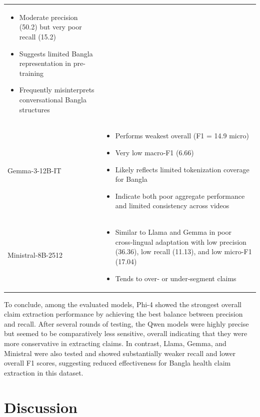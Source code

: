 \documentclass[]{article}
\begin{document}
\begin{longtable}[]{@{}
  >{\raggedright\arraybackslash}p{}
  >{\raggedright\arraybackslash}p{}@{}}
\begin{minipage}[t]{\linewidth}
\begin{itemize}
\item
  Moderate precision (50.2) but very poor recall (15.2)
\item
  Suggests limited Bangla representation in pre-training
\item
  Frequently misinterprets conversational Bangla structures
\end{itemize}
\end{minipage} \\
Gemma-3-12B-IT & \begin{minipage}[t]{\linewidth}\raggedright
\begin{itemize}
\item
  Performs weakest overall (F1 = 14.9 micro)
\item
  Very low macro‑F1 (6.66)
\item
  Likely reflects limited tokenization coverage for Bangla
\item
  Indicate both poor aggregate performance and limited consistency
  across videos
\end{itemize}
\end{minipage} \\
Ministral-8B-2512 &
\begin{minipage}[t]{\linewidth}\raggedright
\begin{itemize}
\item
  Similar to Llama and Gemma in poor cross‑lingual adaptation with low
  precision (36.36), low recall (11.13), and low micro-F1 (17.04)
\item
  Tends to over‑ or under‑segment claims
\end{itemize}
\end{minipage} \\
\end{longtable}

To conclude, among the evaluated models, Phi-4 showed the strongest overall claim
extraction performance by achieving the best balance between precision and
recall. After several rounds of testing, the Qwen models were highly precise but seemed to be comparatively less
sensitive, overall indicating that they were more conservative in extracting
claims. In contrast, Llama, Gemma, and Ministral were also tested and showed substantially
weaker recall and lower overall F1 scores, suggesting reduced
effectiveness for Bangla health claim extraction in this dataset.

\section{Discussion}
\end{document}
